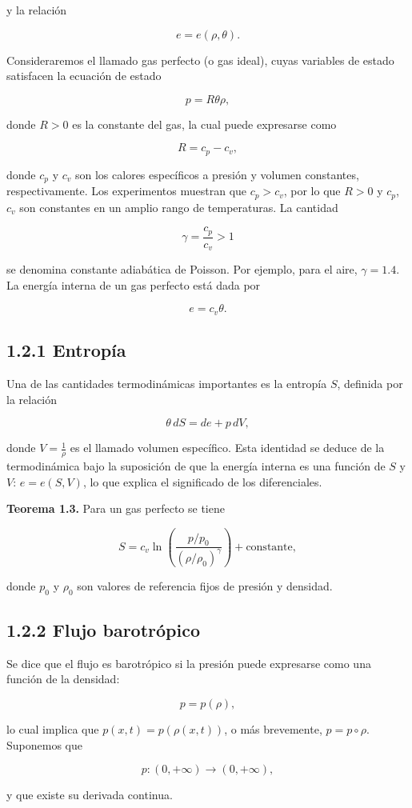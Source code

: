\documentclass[12pt,a4paper]{article}
\begin{document}
y la relación

\[
e = e(\rho, \theta).
\]

Consideraremos el llamado gas perfecto (o gas ideal), cuyas variables de estado satisfacen la ecuación de estado

\[
p = R \theta \rho,
\]

donde $R > 0$ es la constante del gas, la cual puede expresarse como

\[
R = c_p - c_v,
\]

donde $c_p$ y $c_v$ son los calores específicos a presión y volumen constantes, respectivamente. Los experimentos muestran que $c_p > c_v$, por lo que $R > 0$ y $c_p$, $c_v$ son constantes en un amplio rango de temperaturas. La cantidad

\[
\gamma = \frac{c_p}{c_v} > 1
\]

se denomina constante adiabática de Poisson. Por ejemplo, para el aire, $\gamma = 1.4$. La energía interna de un gas perfecto está dada por

\[
e = c_v \theta.
\]

\subsection*{1.2.1 Entropía}

Una de las cantidades termodinámicas importantes es la entropía $S$, definida por la relación

\[
\theta \, dS = de + p \, dV,
\]

donde $V = \frac{1}{\rho}$ es el llamado volumen específico. Esta identidad se deduce de la termodinámica bajo la suposición de que la energía interna es una función de $S$ y $V$: $e = e(S, V)$, lo que explica el significado de los diferenciales.

\textbf{Teorema 1.3.} Para un gas perfecto se tiene

\[
S = c_v \ln \left( \frac{p/p_0}{(\rho/\rho_0)^\gamma} \right) + \text{constante},
\]

donde $p_0$ y $\rho_0$ son valores de referencia fijos de presión y densidad.

\subsection*{1.2.2 Flujo barotrópico}

Se dice que el flujo es barotrópico si la presión puede expresarse como una función de la densidad:

\[
p = p(\rho),
\]

lo cual implica que $p(x,t) = p(\rho(x,t))$, o más brevemente, $p = p \circ \rho$. Suponemos que

\[
p : (0, +\infty) \to (0, +\infty),
\]

y que existe su derivada continua.
\end{document}
